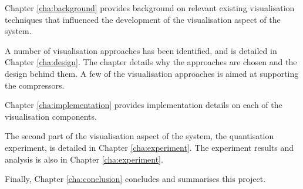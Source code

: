 Chapter \ref{cha:background} provides background on relevant existing
visualisation techniques that influenced the development of the visualisation
aspect of the system.

A number of visualisation approaches has been identified, and is detailed in
Chapter \ref{cha:design}. The chapter details why the approaches are chosen and
the design behind them. A few of the visualisation approaches is aimed at
supporting the compressors.

Chapter \ref{cha:implementation} provides implementation details on each of the
visualisation components.

The second part of the visualisation aspect of the system, the quantisation
experiment, is detailed in Chapter \ref{cha:experiment}. The experiment results
and analysis is also in Chapter \ref{cha:experiment}.

Finally, Chapter \ref{cha:conclusion} concludes and summarises this project.


